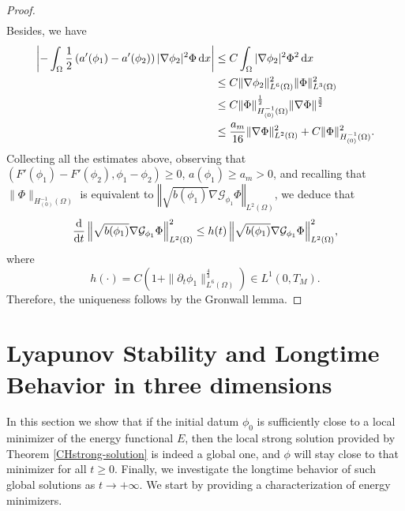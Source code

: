 \documentclass[11pt,reqno]{amsart}
\theoremstyle{remark}
\newcommand \norm[1] {\left\Vert #1\right\Vert}
\def\n{\textbf{\textit{n}}}
\def\G{\mathcal{G}}
\def\d{{\rm d}}
\def\ddt{\frac{\d}{\d t}}
\def\E{\mathcal{E}}
\numberwithin{equation}{section}
\def\d{{\rm d}}
\newcommand{\vp}{\phi}
\begin{document}
\begin{proof}
\begin{align*}
 \end{align*}
Besides, we have
 \begin{align*}
\left| - \int_\Omega \frac12  \left( a'(\phi_1)-a'(\phi_2)\right) | \nabla \phi_2|^2 \Phi \, \d x\right|
&\leq C\int_\Omega   | \nabla \phi_2|^2 \Phi^2 \, \d x
\\
&\leq C \| \nabla \phi_2\|_{L^6(\Omega)}^2
\| \Phi\|_{L^3(\Omega)}^2
\\
&\leq C
\|\Phi\|_{H^{-1}_{(0)}(\Omega)}^{\frac12}
\|\nabla \Phi\|^{\frac32}
\\
&\leq \frac{a_m}{16}\|\nabla \Phi\|^{2}_{L^2(\Omega)}+C\|\Phi\|_{H^{-1}_{(0)}(\Omega)}^{2}.
\end{align*}
Collecting all the estimates above, observing that $(F'(\phi_1)-F'(\phi_2), \phi_1-\phi_2) \geq 0$, $a(\phi_1)\geq a_m>0$, and recalling that
$\|\Phi\|_{H^{-1}_{(0)}(\Omega)}$ is equivalent to $\norm{\sqrt{b(\phi_1)} \nabla \G_{\phi_1} \Phi}_{L^2(\Omega)}$, we deduce that
\begin{equation}
\label{diff-rel-3}
\ddt  \norm{\sqrt{b(\phi_1)}\nabla \G_{\phi_1} \Phi}_{L^2(\Omega)}^2
\leq h(t) \norm{ \sqrt{b(\phi_1)} \nabla \G_{\phi_1} \Phi}_{L^2(\Omega)}^2
\! ,
\end{equation}
where $$
h(\cdot)=C\left( 1+\|\partial_t\phi_1\|_{L^6(\Omega)}^\frac43\right)\in L^1(0,T_M).
$$ 
Therefore, the uniqueness follows by the Gronwall lemma.
\end{proof}

\section{Lyapunov Stability and Longtime Behavior in three dimensions}
\label{S-Lyapunov}
\setcounter{equation}{0}


%

In this section we show that if the initial datum $\vp_0$ is sufficiently close to a local minimizer of the energy functional $E$,  then the local strong solution provided by Theorem \ref{CHstrong-solution} is indeed a global one, and $\vp$ will stay close to that minimizer for all $t \geq 0$. Finally, we investigate the longtime behavior of such global solutions as $t\to+\infty$.
We start by providing a characterization of energy minimizers.
\end{document}
